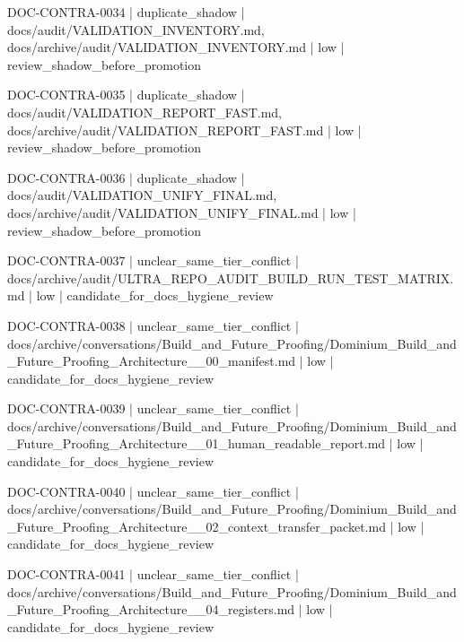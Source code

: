 \documentclass[11pt,a4paper]{report}
\begin{document}
{\small\ttfamily\raggedright DOC-\allowbreak{}CONTRA-\allowbreak{}0034 | duplicate\_shadow | docs/\allowbreak{}audit/\allowbreak{}VALIDATION\_INVENTORY.\allowbreak{}md, docs/\allowbreak{}archive/\allowbreak{}audit/\allowbreak{}VALIDATION\_INVENTORY.\allowbreak{}md | low | review\_shadow\_before\_promotion\par}
{\small\ttfamily\raggedright DOC-\allowbreak{}CONTRA-\allowbreak{}0035 | duplicate\_shadow | docs/\allowbreak{}audit/\allowbreak{}VALIDATION\_REPORT\_FAST.\allowbreak{}md, docs/\allowbreak{}archive/\allowbreak{}audit/\allowbreak{}VALIDATION\_REPORT\_FAST.\allowbreak{}md | low | review\_shadow\_before\_promotion\par}
{\small\ttfamily\raggedright DOC-\allowbreak{}CONTRA-\allowbreak{}0036 | duplicate\_shadow | docs/\allowbreak{}audit/\allowbreak{}VALIDATION\_UNIFY\_FINAL.\allowbreak{}md, docs/\allowbreak{}archive/\allowbreak{}audit/\allowbreak{}VALIDATION\_UNIFY\_FINAL.\allowbreak{}md | low | review\_shadow\_before\_promotion\par}
{\small\ttfamily\raggedright DOC-\allowbreak{}CONTRA-\allowbreak{}0037 | unclear\_same\_tier\_conflict | docs/\allowbreak{}archive/\allowbreak{}audit/\allowbreak{}ULTRA\_REPO\_AUDIT\_BUILD\_RUN\_TEST\_MATRIX.\allowbreak{}md | low | candidate\_for\_docs\_hygiene\_review\par}
{\small\ttfamily\raggedright DOC-\allowbreak{}CONTRA-\allowbreak{}0038 | unclear\_same\_tier\_conflict | docs/\allowbreak{}archive/\allowbreak{}conversations/\allowbreak{}Build\_and\_Future\_Proofing/\allowbreak{}Dominium\_Build\_and\_Future\_Proofing\_Architecture\_\_00\_manifest.\allowbreak{}md | low | candidate\_for\_docs\_hygiene\_review\par}
{\small\ttfamily\raggedright DOC-\allowbreak{}CONTRA-\allowbreak{}0039 | unclear\_same\_tier\_conflict | docs/\allowbreak{}archive/\allowbreak{}conversations/\allowbreak{}Build\_and\_Future\_Proofing/\allowbreak{}Dominium\_Build\_and\_Future\_Proofing\_Architecture\_\_01\_human\_readable\_report.\allowbreak{}md | low | candidate\_for\_docs\_hygiene\_review\par}
{\small\ttfamily\raggedright DOC-\allowbreak{}CONTRA-\allowbreak{}0040 | unclear\_same\_tier\_conflict | docs/\allowbreak{}archive/\allowbreak{}conversations/\allowbreak{}Build\_and\_Future\_Proofing/\allowbreak{}Dominium\_Build\_and\_Future\_Proofing\_Architecture\_\_02\_context\_transfer\_packet.\allowbreak{}md | low | candidate\_for\_docs\_hygiene\_review\par}
{\small\ttfamily\raggedright DOC-\allowbreak{}CONTRA-\allowbreak{}0041 | unclear\_same\_tier\_conflict | docs/\allowbreak{}archive/\allowbreak{}conversations/\allowbreak{}Build\_and\_Future\_Proofing/\allowbreak{}Dominium\_Build\_and\_Future\_Proofing\_Architecture\_\_04\_registers.\allowbreak{}md | low | candidate\_for\_docs\_hygiene\_review\par}
\end{document}

